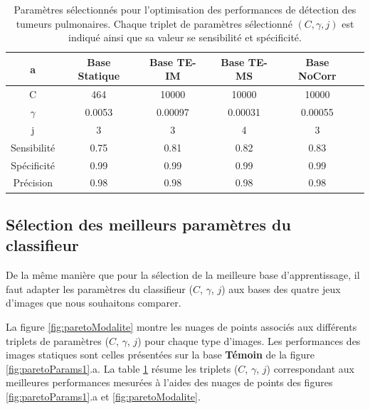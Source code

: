 \begin{table}[h!]
	\begin{center}
		\begin{tabular}{c| c c c c c}
  \hline
  a	& Base Statique	& Base TE-IM	& Base TE-MS	& Base NoCorr	\\
  \hline
 C 	& 464		& 10000		& 10000		& 10000		\\
\hline
$\gamma$& 0.0053	& 0.00097	& 0.00031	& 0.00055	\\
\hline
j	& 3		& 3		& 4		& 3		\\
\hline
\hline
Sensibilité& 0.75	& 0.81		& 0.82		& 0.83	\\
\hline
Spécificité& 0.99	& 0.99		& 0.99		& 0.99		\\
\hline
Précision& 0.98		& 0.98		& 0.98		& 0.98		\\
\hline
 		\end{tabular}

	\end{center}
\caption[Paramètres sélectionnés pour l'optimisation des performances de détection des tumeurs pulmonaires]{Paramètres sélectionnés pour l'optimisation des performances de détection des tumeurs pulmonaires. Chaque triplet de paramètres sélectionné $(C,\gamma,j)$ est indiqué ainsi que sa valeur se sensibilité et spécificité.}
\label{tab:paramsModPoumon}
\end{table}

\subsection{Sélection des meilleurs paramètres du classifieur}

De la même manière que pour la sélection de la meilleure base d'apprentissage, il faut adapter les paramètres du classifieur ($C$, $\gamma$, $j$) aux bases des quatre jeux d'images que nous souhaitons comparer.

La figure \ref{fig:paretoModalite} montre les nuages de points associés aux différents triplets de paramètres ($C$, $\gamma$, $j$) pour chaque type d'images. Les performances des images statiques sont celles présentées sur la base \textbf{Témoin} de la figure \ref{fig:paretoParams1}.a. La table \ref{tab:paramsModPoumon} résume les triplets ($C$, $\gamma$, $j$) correspondant aux meilleures performances mesurées à l'aides des nuages de points des figures \ref{fig:paretoParams1}.a et \ref{fig:paretoModalite}.


